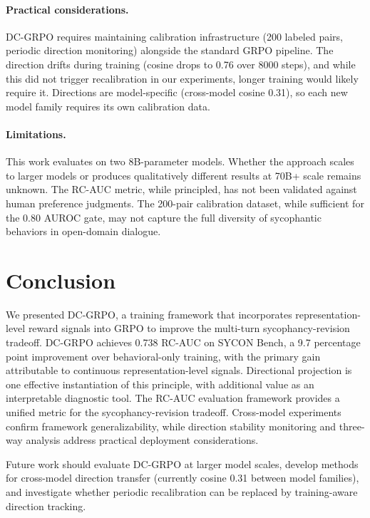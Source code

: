 \documentclass[11pt,a4paper]{article}
\begin{document}
\paragraph{Practical considerations.} DC-GRPO requires maintaining calibration infrastructure (200 labeled pairs, periodic direction monitoring) alongside the standard GRPO pipeline. The direction drifts during training (cosine drops to 0.76 over 8000 steps), and while this did not trigger recalibration in our experiments, longer training would likely require it. Directions are model-specific (cross-model cosine 0.31), so each new model family requires its own calibration data.

\paragraph{Limitations.} This work evaluates on two 8B-parameter models. Whether the approach scales to larger models or produces qualitatively different results at 70B+ scale remains unknown. The RC-AUC metric, while principled, has not been validated against human preference judgments. The 200-pair calibration dataset, while sufficient for the 0.80 AUROC gate, may not capture the full diversity of sycophantic behaviors in open-domain dialogue.

\section{Conclusion}
\label{sec:conclusion}

We presented DC-GRPO, a training framework that incorporates representation-level reward signals into GRPO to improve the multi-turn sycophancy-revision tradeoff. DC-GRPO achieves 0.738 RC-AUC on SYCON Bench, a 9.7 percentage point improvement over behavioral-only training, with the primary gain attributable to continuous representation-level signals. Directional projection is one effective instantiation of this principle, with additional value as an interpretable diagnostic tool. The RC-AUC evaluation framework provides a unified metric for the sycophancy-revision tradeoff. Cross-model experiments confirm framework generalizability, while direction stability monitoring and three-way analysis address practical deployment considerations.

Future work should evaluate DC-GRPO at larger model scales, develop methods for cross-model direction transfer (currently cosine 0.31 between model families), and investigate whether periodic recalibration can be replaced by training-aware direction tracking.
\end{document}

